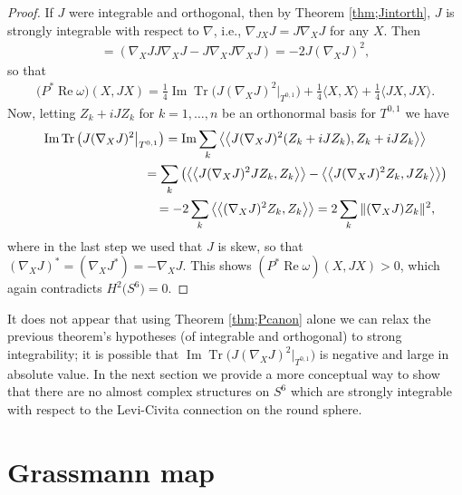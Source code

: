 \documentclass[pdftex]{sigma}
\DeclareMathOperator{\Tr}{Tr}
\numberwithin{equation}{section}
\begin{document}
\begin{proof}
If $J$ were integrable and orthogonal, then by Theorem \ref{thm;Jintorth}, $J$ is strongly integrable with respect to $\nabla$, i.e., $\nabla_{JX} J = J \nabla_X J$
for any $X$. Then
\begin{gather*}
 [\nabla_X J, \nabla_{JX} J] = ( \nabla_X J J \nabla_{X} J - J \nabla_X J \nabla_{X} J )=-2 J ( \nabla_X J )^2,
\end{gather*}
so that
\begin{gather*}
\big( P^*\operatorname{Re} \omega\big)(X,JX) = \frac{1}{4} \operatorname{Im} \Tr\big( J ( \nabla_X J )^2 \big|_{T^{0,1}} \big) + \frac 1 4 \langle X,X\rangle + \frac 1 4 \langle JX,JX \rangle .
\end{gather*}
Now, letting $Z_k +iJZ_k$ for $k= 1, \ldots , n$ be an orthonormal basis for $T^{0,1}$ we have
\begin{gather*}
\operatorname{Im} \Tr\big( J ( \nabla_X J )^2 \big|_{T^{0,1}} \big) = \operatorname{Im} \sum_k \big\langle\big\langle J ( \nabla_X J )^2 (Z_k +iJZ_k), Z_k +iJZ_k \big\rangle\big\rangle \\
\hphantom{\operatorname{Im} \Tr\big( J ( \nabla_X J )^2 \big|_{T^{0,1}} \big)}{} =
\sum_k \big( \big\langle\big\langle J (\nabla_X J)^2 JZ_k, Z_k \big\rangle\big\rangle -
 \big\langle\big\langle J (\nabla_X J)^2 Z_k , JZ_k \big\rangle\big\rangle \big) \\
\hphantom{\operatorname{Im} \Tr\big( J ( \nabla_X J )^2 \big|_{T^{0,1}} \big)}{}
 = -2 \sum_k \big\langle\big\langle (\nabla_X J)^2 Z_k, Z_k \big\rangle\big\rangle = 2 \sum_k \| (\nabla_X J) Z_k \|^2,
\end{gather*}
where in the last step we used that $J$ is skew, so that $(\nabla_X J)^* = ( \nabla_X J^* ) = - \nabla_X J $. This shows $(P^* \operatorname{Re} \omega)(X,JX) > 0$, which again contradicts $H^2\big(S^6\big) = 0$.
\end{proof}

It does not appear that using Theorem \ref{thm;Pcanon} alone we can relax the previous theorem's hypotheses (of integrable and orthogonal)
to strong integrability; it is possible that $\operatorname{Im} \Tr\big( J ( \nabla_X J )^2 \big|_{T^{0,1}} \big)$ is negative and large in absolute value. In the next section we provide a more conceptual way to show that there are no almost complex structures on $S^6$ which are strongly integrable with respect to the Levi-Civita connection on the round sphere.

\section{Grassmann map} \label{sec;Gmap}
\end{document}
